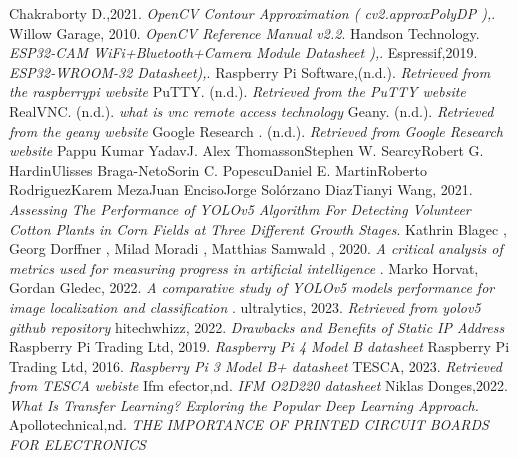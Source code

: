 \begin{thebibliography}{20}
Chakraborty D.,2021. \emph{ OpenCV Contour Approximation ( cv2.approxPolyDP ),}.
Willow Garage, 2010. \emph{OpenCV Reference Manual v2.2}.
Handson Technology. \emph{ ESP32-CAM WiFi+Bluetooth+Camera Module Datasheet ),}.
Espressif,2019. \emph{ ESP32-WROOM-32 Datasheet),}.
Raspberry Pi Software,(n.d.). \emph{Retrieved from the raspberrypi website}%
PuTTY. (n.d.). \emph{Retrieved from the PuTTY website} %
RealVNC. (n.d.). \emph{what is vnc remote access technology}%
Geany. (n.d.). \emph{Retrieved from the geany website} %
Google Research . (n.d.). \emph{ Retrieved from Google Research website} %
Pappu Kumar YadavJ. Alex ThomassonStephen W. SearcyRobert G. HardinUlisses Braga-NetoSorin C. PopescuDaniel E. MartinRoberto RodriguezKarem MezaJuan EncisoJorge Solórzano DiazTianyi Wang, 2021. \emph{ Assessing The Performance of YOLOv5 Algorithm For Detecting Volunteer Cotton Plants in Corn Fields at Three Different Growth Stages}.
Kathrin Blagec  , Georg Dorffner  , Milad Moradi , Matthias Samwald , 2020. \emph{ A critical analysis of metrics used for measuring progress in artificial intelligence }.
Marko Horvat, Gordan Gledec, 2022. \emph{A comparative study of YOLOv5 models performance for image localization and classification  }.
ultralytics, 2023. \emph{Retrieved from yolov5 github repository} %
hitechwhizz, 2022. \emph{ Drawbacks and Benefits of Static IP Address}
Raspberry Pi Trading Ltd, 2019. \emph{ Raspberry Pi 4 Model B datasheet}
Raspberry Pi Trading Ltd, 2016. \emph{ Raspberry Pi 3 Model B+ datasheet}
TESCA, 2023. \emph{Retrieved from TESCA webiste }
Ifm efector,nd. \emph{ IFM O2D220  datasheet}
Niklas Donges,2022. \emph{What Is Transfer Learning? Exploring the Popular Deep Learning Approach.}
Apollotechnical,nd. \emph{THE IMPORTANCE OF PRINTED CIRCUIT BOARDS FOR ELECTRONICS}





\end{thebibliography}
